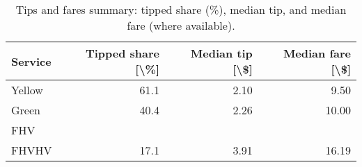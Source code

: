 \begin{table}
\caption{Tips and fares summary: tipped share (\%), median tip, and median fare (where available).}
\label{tab:t4_tips_fares}
\begin{tabular}{lrrr}
\toprule
Service & Tipped share [\textbackslash \%] & Median tip [\textbackslash \$] & Median fare [\textbackslash \$] \\
\midrule
Yellow & 61.1 & 2.10 & 9.50 \\
Green & 40.4 & 2.26 & 10.00 \\
FHV &  &  &  \\
FHVHV & 17.1 & 3.91 & 16.19 \\
\bottomrule
\end{tabular}
\end{table}
